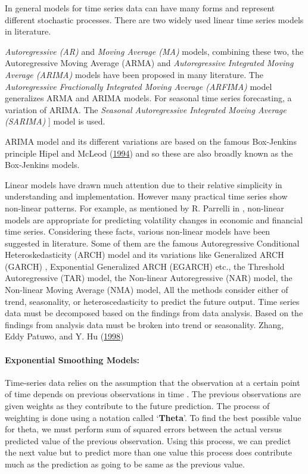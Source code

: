 \documentclass[
  onepage,
  openany]{scrbook}
\let\oldparagraph\paragraph
\renewcommand{\paragraph}[1]{\oldparagraph{#1}\mbox{}}
\begin{document}
In general models for time series data can have many forms and represent
different stochastic processes. There are two widely used linear time
series models in literature.

\emph{Autoregressive (AR)} and \emph{Moving Average (MA)} models,
combining these two, the Autoregressive Moving Average (ARMA) and
\emph{Autoregressive Integrated Moving Average (ARIMA)} models have been
proposed in many literature. The \emph{Autoregressive Fractionally
Integrated Moving Average (ARFIMA)} model generalizes ARMA and ARIMA
models. For seasonal time series forecasting, a variation of ARIMA. The
\emph{Seasonal Autoregressive Integrated Moving Average (SARIMA)} {]}
model is used.

ARIMA model and its different variations are based on the famous
Box-Jenkins principle Hipel and McLeod
(\protect\hyperlink{ref-hipel1994}{1994}) and so these are also broadly
known as the Box-Jenkins models.

Linear models have drawn much attention due to their relative simplicity
in understanding and implementation. However many practical time series
show non-linear patterns. For example, as mentioned by R. Parrelli in ,
non-linear models are appropriate for predicting volatility changes in
economic and financial time series. Considering these facts, various
non-linear models have been suggested in literature. Some of them are
the famous Autoregressive Conditional Heteroskedasticity (ARCH) model
and its variations like Generalized ARCH (GARCH) , Exponential
Generalized ARCH (EGARCH) etc., the Threshold Autoregressive (TAR)
model, the Non-linear Autoregressive (NAR) model, the Non-linear Moving
Average (NMA) model, All the methods consider either of trend,
seasonality, or heteroscedasticity to predict the future output. Time
series data must be decomposed based on the findings from data analysis.
Based on the findings from analysis data must be broken into trend or
seasonality. Zhang, Eddy Patuwo, and Y. Hu
(\protect\hyperlink{ref-zhang1998}{1998})

\hypertarget{exponential-smoothing-models}{%
\paragraph{Exponential Smoothing
Models:}\label{exponential-smoothing-models}}

Time-series data relies on the assumption that the observation at a
certain point of time depends on previous observations in time . The
previous observations are given weights as they contribute to the future
prediction. The process of weighting is done using a notation called
`\textbf{Theta}'. To find the best possible value for theta, we must
perform sum of squared errors between the actual versus predicted value
of the previous observation. Using this process, we can predict the next
value but to predict more than one value this process does contribute
much as the prediction as going to be same as the previous value.
\end{document}

